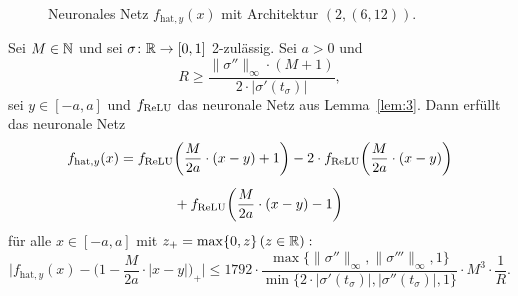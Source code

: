 \begin{figure}[htp]

\caption{Neuronales Netz $f_{\mathrm{\mathrm{hat}},y}(x)$ mit Architektur $(2, (6, 12))$.}
\label{fig:fhat}
\end{figure} 
  \begin{lem}
  \label{lem:4}
  Sei $M \in \mathbb{N}$ und sei $\sigma\colon \mathbb{R} \to [0, 1]$ 2-zulässig. Sei $a > 0$ und $$R \geq \frac{\|\sigma''\|_{\infty} \cdot (M + 1)}{2 \cdot |\sigma'(t_{\sigma})|},$$ sei $y \in [-a, a]$ und $f_{\mathrm{ReLU}}$ das neuronale Netz aus Lemma~\ref{lem:3}. Dann erfüllt das neuronale Netz 
  \begin{equation*}
  \begin{split}
  f_{\mathrm{hat},y}(x) = f_{\mathrm{ReLU}}& \bigg(\frac{M}{2a} \cdot (x - y) + 1\bigg) - 2 \cdot f_{\mathrm{ReLU}}\bigg(\frac{M}{2a} \cdot (x - y)\bigg) \\[0.5em] &+ f_{\mathrm{ReLU}}\bigg(\frac{M}{2a} \cdot (x - y) - 1\bigg)
  \end{split}
  \end{equation*}
  für alle $x \in [-a ,a]$ mit $z_+ = \max\{0, z\} \, (z \in \mathbb{R}):$   
  $$\bigg|f_{\mathrm{hat},y}(x) - \bigg(1 - \frac{M}{2a} \cdot |x - y|\bigg)_+\bigg| \leq 1792 \cdot \frac{\max\{\|\sigma''\|_{\infty}, \|\sigma'''\|_{\infty}, 1\}}{\min\{2 \cdot |\sigma'(t_{\sigma})|, |\sigma''(t_{\sigma})|, 1\}} \cdot M^3 \cdot \frac{1}{R}.$$
  \end{lem}
